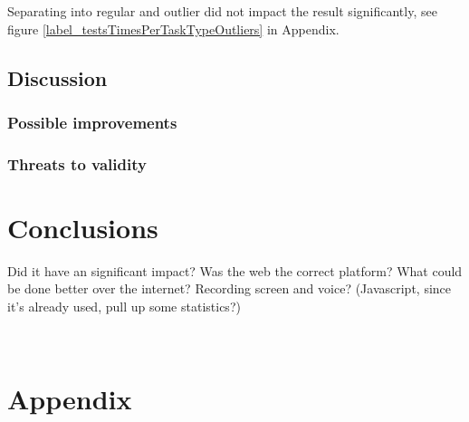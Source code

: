 \documentclass[nofilelist,dvipsnames]{cslthse-msc}
\begin{document}
        Separating into regular and outlier did not impact the result
        significantly, see figure \ref{label_testsTimesPerTaskTypeOutliers} in
        Appendix.



		\section{Discussion}

			\subsection{Possible improvements}

			\subsection{Threats to validity}





	\chapter{Conclusions}

		Did it have an significant impact? Was the web the correct platform? What
		could be done better over the internet? Recording screen and voice?
		(Javascript, since it's already used, pull up some statistics?)


	\checkoddpage
	\ifoddpage
	\else
		 \newpage
		 \thispagestyle{empty}
		 \mbox{ }
	\fi

  \chapter{Appendix}
\end{document}
